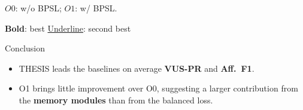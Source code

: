\documentclass[aspectratio=169]{beamer}
\begin{document}
\begin{frame}
{\begin{tabular}{lcccccccccccc}
        \bottomrule
    \end{tabular}%
    }

    \vspace{0.05em}
    \scriptsize
    $O0$: w/o BPSL; \qquad $O1$: w/ BPSL.

    \vspace{0.15em}

    \scriptsize
    \textbf{Bold}: best
    \qquad
    \underline{Underline}: second best

    \vspace{-0.25em}

    \begin{exampleblock}{Conclusion}
        \scriptsize
        \begin{itemize}
            \setlength{\itemsep}{0.1em}
            \item THESIS leads the baselines on average
                  \textbf{VUS-PR} and \textbf{Aff.\ F1}.
            \item O1 brings little improvement over O0,
                  suggesting a larger contribution from the
                  \textbf{memory modules} than from the balanced loss.
        \end{itemize}
    \end{exampleblock}

\end{frame}
\end{document}
